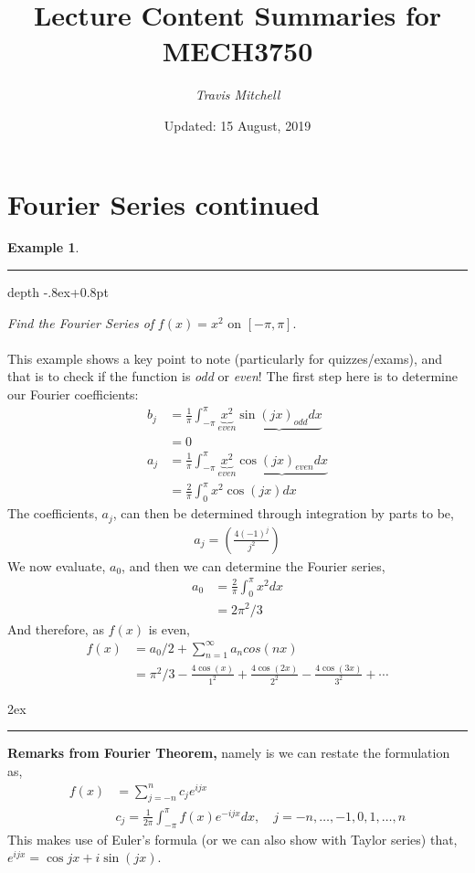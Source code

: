 \documentclass[11pt,a4paper]{report}
\author{\textit{Travis Mitchell}}
\title{Lecture Content Summaries for MECH3750}
\date{Updated: 15 August, 2019}
\theoremstyle{definition}
\newtheorem{exinn}{Example}[section]
\newenvironment{example}
{\clubpenalty=10000
	\begin{exinn}%
		\mbox{}%
		{\color{blue}\leaders\hrule height .8ex depth \dimexpr-.8ex+0.8pt\relax\hfill}%
		\mbox{}\linebreak\ignorespaces}
	{\par\kern2ex\hrule\end{exinn}}
\begin{document}
\section{Fourier Series continued}
	\begin{example}
		\textit{Find the Fourier Series of} $f(x) = x^2$ on $[-\pi, \pi]$. \\\\
		This example shows a key point to note (particularly for quizzes/exams), and that is to check if the function is \textit{odd} or \textit{even}! The first step here is to determine our Fourier coefficients:
		\begin{align*}
			b_j &= \frac{1}{\pi} \int_{-\pi}^{\pi} \underbrace{x^2}_{even} \underbrace{\sin(j x)_{odd} dx} \\
				&= 0 \\
			a_j &= \frac{1}{\pi} \int_{-\pi}^{\pi} \underbrace{x^2}_{even} \underbrace{\cos(j x)_{even} dx} \\
			&= \frac{2}{\pi} \int_{0}^{\pi} x^2 \cos(j x) dx 
		\end{align*}
		The coefficients, $a_j$, can then be determined through integration by parts to be,
		\begin{align*}
			a_j = \left( \frac{4(-1)^{j}}{j^2} \right)
		\end{align*}
		We now evaluate, $a_0$, and then we can determine the Fourier series,
		\begin{align*}
			a_0&= \frac{2}{\pi} \int_0^{\pi} x^2 dx\\
			   &= 2\pi^2/3
		\end{align*}
		And therefore, as $f(x)$ is even,
		\begin{align*}
			f(x)&= a_0/2 + \sum_{n=1} ^{\infty} a_n cos(nx)\\
				&= \pi^2/3 - \frac{4\cos(x)}{1^2} + \frac{4\cos(2x)}{2^2} - \frac{4\cos(3x)}{3^2} + \cdots
		\end{align*}
	\end{example}

	\textbf{Remarks from Fourier Theorem,} namely is we can restate the formulation as,
	\begin{align*}
		f(x) &= \sum_{j=-n}^{n} c_j e^{ijx} \\
			 &c_j = \frac{1}{2\pi} \int_{-\pi}^{\pi} f(x) e^{-ijx} dx, \quad j=-n,\dots, -1, 0,1,\dots,n
	\end{align*}
	This makes use of Euler's formula (or we can also show with Taylor series) that, $e^{ijx} = \cos{jx} + i \sin(jx)$. \\
	
\end{document}
